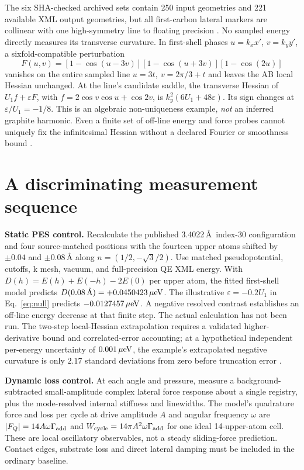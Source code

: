 \documentclass[9pt,a4paper,twocolumn]{extarticle}
\begin{document}
The six SHA-checked archived sets contain 250 input geometries and 221 available XML output geometries, but all first-carbon lateral markers are collinear with one high-symmetry line to floating precision \cite{udrecord,zenodo}. No sampled energy directly measures its transverse curvature. In first-shell phases $u=k_xx'$, $v=k_yy'$, a sixfold-compatible perturbation
\begin{equation}
 F(u,v)=[1-\cos(u-3v)][1-\cos(u+3v)][1-\cos(2u)] \label{eq:null}
\end{equation}
vanishes on the entire sampled line $u=3t,\ v=2\pi/3+t$ and leaves the AB local Hessian unchanged. At the line's candidate saddle, the transverse Hessian of $U_1f+\varepsilon F$, with $f=2\cos v\cos u+\cos2v$, is $k_y^2(6U_1+48\varepsilon)$. Its sign changes at $\varepsilon/U_1=-1/8$. This is an algebraic non-uniqueness example, \emph{not} an inferred graphite harmonic. Even a finite set of off-line energy and force probes cannot uniquely fix the infinitesimal Hessian without a declared Fourier or smoothness bound \cite{udrecord}.

\section{A discriminating measurement sequence}
\textbf{Static PES control.} Recalculate the published 3.4022\,\AA\ index-30 configuration and four source-matched positions with the fourteen upper atoms shifted by $\pm0.04$ and $\pm0.08\,\text{\AA}$ along $n=(1/2,-\sqrt3/2)$. Use matched pseudopotential, cutoffs, k mesh, vacuum, and full-precision QE XML energy. With $D(h)=E(h)+E(-h)-2E(0)$ per upper atom, the fitted first-shell model predicts $D(0.08\,\text{\AA})=+0.0450423\,\mu{\rm eV}$. The illustrative $\varepsilon=-0.2U_1$ in Eq.~\eqref{eq:null} predicts $-0.0127457\,\mu{\rm eV}$. A negative resolved contrast establishes an off-line energy decrease at that finite step. The actual calculation has not been run. The two-step local-Hessian extrapolation requires a validated higher-derivative bound and correlated-error accounting; at a hypothetical independent per-energy uncertainty of $0.001\,\mu{\rm eV}$, the example's extrapolated negative curvature is only $2.17$ standard deviations from zero before truncation error \cite{udrecord}.

\textbf{Dynamic loss control.} At each angle and pressure, measure a background-subtracted small-amplitude complex lateral force response about a single registry, plus the mode-resolved internal stiffness and linewidths. The model's quadrature force and loss per cycle at drive amplitude $A$ and angular frequency $\omega$ are $|F_Q|=14A\omega\Gamma_{\rm add}$ and $W_{\rm cycle}=14\pi A^2\omega\Gamma_{\rm add}$ for one ideal 14-upper-atom cell. These are local oscillatory observables, not a steady sliding-force prediction. Contact edges, substrate loss and direct lateral damping must be included in the ordinary baseline.
\end{document}
